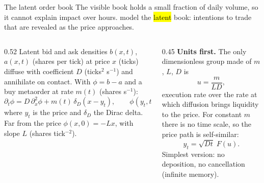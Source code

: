 \documentclass[aspectratio=169,10pt]{beamer}
\begin{document}
\begin{frame}{The latent order book}
  \small
  The visible book holds a small fraction of daily volume, so it cannot explain impact over hours. \citet{donier2015fully} model the \hl{latent} book: intentions to trade that are revealed as the price approaches.
  \vspace{0.2em}
  \begin{columns}[T]
    \begin{column}{0.52\textwidth}
      Latent bid and ask densities $b(x,t)$, $a(x,t)$ (shares per tick) at price $x$ (ticks) diffuse with coefficient $D$ (ticks$^2$ s$^{-1}$) and annihilate on contact. With $\phi = b - a$ and a buy metaorder at rate $m(t)$ (shares s$^{-1}$):
      \[ \partial_t\phi = D\,\partial_x^2\phi + m(t)\,\delta_D(x - y_t), \qquad \phi(y_t, t) = 0, \]
      where $y_t$ is the price and $\delta_D$ the Dirac delta. Far from the price $\phi(x, 0) = -Lx$, with slope $L$ (shares tick$^{-2}$).
    \end{column}
    \begin{column}{0.45\textwidth}
      \textbf{Units first.} The only dimensionless group made of $m$, $L$, $D$ is
      \[ u = \frac{m}{LD}, \]
      execution rate over the rate at which diffusion brings liquidity to the price. For constant $m$ there is no time scale, so the price path is self-similar:
      \[ y_t = \sqrt{Dt}\;F(u). \]
      Simplest version: no deposition, no cancellation (infinite memory).
    \end{column}
  \end{columns}
\end{frame}
\end{document}
